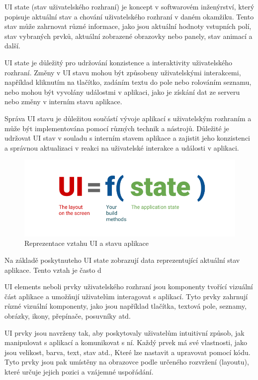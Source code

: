  \label{UIStateParagraph}
UI state (stav uživatelského rozhraní) je koncept v softwarovém inženýrství, který popisuje aktuální stav a chování uživatelského 
rozhraní v daném okamžiku. Tento stav může zahrnovat různé informace, jako jsou aktuální hodnoty vstupních polí, stav vybraných prvků,
 aktuální zobrazené obrazovky nebo panely, stav animací a další.

UI state je důležitý pro udržování konzistence a interaktivity uživatelského rozhraní. Změny v UI stavu mohou být způsobeny uživatelskými
interakcemi, například kliknutím na tlačítko, zadáním textu do pole nebo rolováním seznamu, nebo mohou být vyvolány událostmi v aplikaci,
jako je získání dat ze serveru nebo změny v interním stavu aplikace.

Správa UI stavu je důležitou součástí vývoje aplikací s uživatelským rozhraním a může být implementována pomocí různých technik a nástrojů.
Důležité je udržovat UI stav v souladu s interním stavem aplikace a zajistit jeho konzistenci a správnou aktualizaci v reakci na uživatelské 
interakce a události v aplikaci.

\begin{figure}[H]
  \centering
  \includegraphics[width=.4\textwidth]{ui-equals-function-of-state.png}
  \caption{Reprezentace vztahu UI a stavu aplikace}
  \label{fig:arch_diagram}
\end{figure}

Na základě poskytnuteho UI state zobrazují data reprezentující aktuální stav aplikace. Tento vztah je často d


UI elements neboli prvky uživatelského rozhraní jsou komponenty tvořící vizuální část aplikace a umožňují uživatelům interagovat s aplikací.
Tyto prvky zahrnují různé vizuální komponenty, jako jsou například tlačítka, textová pole, seznamy, obrázky, ikony, přepínače, posuvníky atd.

UI prvky jsou navrženy tak, aby poskytovaly uživatelům intuitivní způsob, jak manipulovat s aplikací a komunikovat s ní. Každý prvek má své 
vlastnosti, jako jsou velikost, barva, text, stav atd., Které lze nastavit a upravovat pomocí kódu. Tyto prvky jsou pak umístěny na obrazovce 
podle určeného rozvržení (layoutu), které určuje jejich pozici a vzájemné uspořádání.

